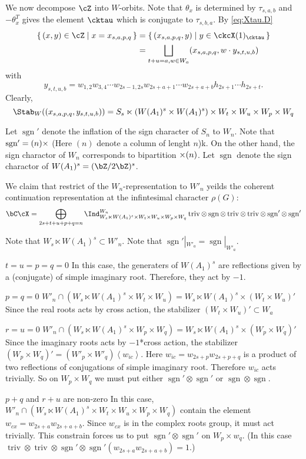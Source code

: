 \documentclass[12pt,a4paper]{amsart}
\def\gen#1{\left\langle
    #1
      \right\rangle}
\newcommand{\sgn}{\operatorname{sgn}}
\newcommand{\triv}{\operatorname{triv}}
\numberwithin{equation}{section}
\theoremstyle{remark}
\begin{document}
We now decompose $\cZ$ into $W$-orbits.  Note that $\theta_x$ is determined by
$\tau_{s,a,b}$ and $-\theta_x^T$ gives the element $\cktau$ which is conjugate
to $\tau_{s,b,a}$.
By \eqref{eq:Xtau.D}
\[
  \begin{split}
    \set{(x,y)\in \cZ| x = x_{s,a,p,q}} & = \set{(x_{s,a,p,q},y)|y\in
    \ckcX(1)_{\cktau}} \\
  &= \bigsqcup_{t+u=a, w\in W_a} (x_{s,a,p,q},w \cdot y_{s,t,u,b}) 
\end{split}
\]
with
\[
  y_{s,t,u,b} = w_{1,2}w_{3,4}\cdots w_{2s-1,2s} w_{2s+a+1}\cdots w_{2s+a+b}
  h_{2s+1}\cdots h_{2s+t}.
\]
Clearly,
\[
  \Stab_W((x_{s,a,p,q},y_{s,t,u,b})) = S_s \ltimes ( W(A_1)^s \times W(A_1)^s) \times W_t\times W_u \times
    W_p\times W_q
\]

Let $\sgn'$ denote the inflation of the sign character of $S_n$ to $W_n$.  Note
that $\sgn' = (n)\times \empty$ (Here $(n)$ denote a column of lenght $n$)k. On
the other hand, the sign charactor of $W_n$ corresponds to bipartition
$\empty\times (n)$.
Let $\sgn$ denote the sign charactor of $W(A_1)^s = (\bZ/2\bZ)^s$.

We claim that restrict of the $W_n$-representation to $W'_n$ yeilds the coherent
continuation representation at the infintesimal character $\rho(G)$:
\[
  \bC \cX = \bigoplus_{2s+t+u+p+q=n}\Ind_{W_s\ltimes W(A_1)^s\times W_t\times
    W_u\times W_p\times W_q}^{W_{n}} \triv \otimes \sgn \otimes \triv \otimes \triv
  \otimes \sgn'\otimes \sgn'
\]

Note that $W_s\ltimes W(A_1)^s\subset W'_n$.
Note that $\sgn'|_{W'_a} =\sgn|_{W'_a}$.
\begin{des}
\item [$t=u=p=q=0$] In this case, the generaters of $W(A_1)^s$ are reflections
  given by a (conjugate) of simple
  imaginary root. 
  Therefore, they act by $-1$. 
\item [$p=q=0$] $W'_n \cap (W_s \ltimes W(A_1)^s \times W_t\times W_u) = W_s \ltimes W(A_1)^s \times (W_t\times W_u)'$  
  Since the real roots acts by cross action, the stabilizer $(W_t\times
  W_u)'\subset W_a$
\item [$r=u=0$] $W'_n \cap (W_s \ltimes W(A_1)^s \times W_p\times W_q) = W_s \ltimes W(A_1)^s \times (W_p\times W_q)'$  
  Since the imaginary roots acts by $-1$*cross action, the stabilizer $(W_p\times
  W_q)' = (W'_p\times W'_q) \gen{w_{ic}}$. Here $w_{ic} = w_{2s+p}w_{2s+p+q}$ is
  a product of two reflections of conjugations of simple imaginary root.
  Therefore $w_{ic}$ acts trivially.
  So on $W_p\times W_q$ we must put either $\sgn'\otimes \sgn'$ or
  $\sgn\otimes \sgn$.
\item [$p+q$ and $r+u$ are non-zero]
  In this case, $W'_n \cap (W_s \ltimes W(A_1)^s \times W_t\times W_u \times
  W_p\times W_q)$ contain the element $w_{cx} = w_{2s+a}w_{2s+a+b}$.
  Since $w_{cx}$ is in the complex roots group, it must act trivially.
  This constrain forces us to put $\sgn'\otimes \sgn'$ on $W_p\times w_q$.
  (In this case $\triv\otimes \triv \otimes \sgn'\otimes\sgn'(w_{2s+a}w_{2s+a+b})=1$.)
\end{des}
\end{document}
